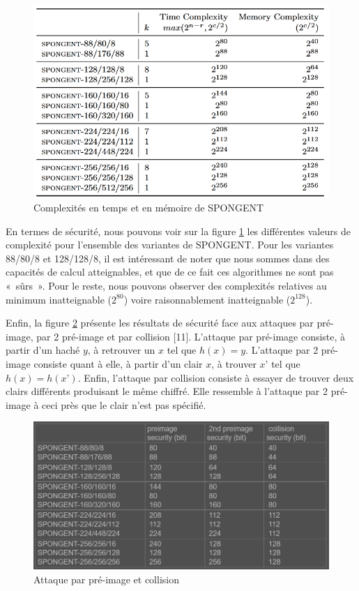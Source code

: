 		\begin{figure}[h]
			\centering
			\includegraphics[width=\textwidth]{imgs/Spongent/timeComplexity.png}
			\caption{Complexités en temps et en mémoire de SPONGENT}
			\label{timeComplexity}
		\end{figure}

		En termes de sécurité, nous pouvons voir sur la figure \ref{timeComplexity} les différentes valeurs de complexité pour l’ensemble des variantes de SPONGENT.
		Pour les variantes 88/80/8 et 128/128/8, il est intéressant de noter que nous sommes dans des capacités de calcul atteignables, et que de ce fait ces algorithmes ne sont pas « sûrs ».
		Pour le reste, nous pouvons observer des complexités relatives au minimum inatteignable ($2^{80}$) voire raisonnablement inatteignable ($2^{128}$).

		Enfin, la figure \ref{attaquePreImage} présente les résultats de sécurité face aux attaques par pré-image, par 2 pré-image et par collision [11].
		L’attaque par pré-image consiste, à partir d’un haché $y$, à retrouver un $x$ tel que $h(x) = y$.
		L’attaque par 2 pré-image consiste quant à elle, à partir d’un clair $x$, à trouver $x’$ tel que $h(x) = h(x’)$.
		Enfin, l’attaque par collision consiste à essayer de trouver deux clairs différents produisant le même chiffré.
		Elle ressemble à l’attaque par 2 pré-image à ceci près que le clair n’est pas spécifié.

		\begin{figure}[!h]
			\centering
			\includegraphics[width=\textwidth, height=0.3\textheight]{imgs/Spongent/attaquePreImage.png}
			\caption{Attaque par pré-image et collision}
			\label{attaquePreImage}
		\end{figure}


